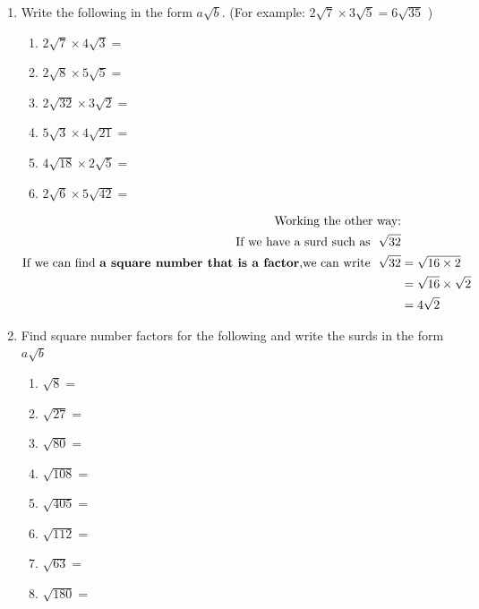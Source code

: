 \documentclass[a4paper,12pt]{article}
\begin{document}
\begin{enumerate}
	\item Write the following in the form $a\sqrt{b}$.
	(\footnotesize For example: $2\sqrt{7}\times 3\sqrt{5}=6\sqrt{35}$ \normalsize)
	\begin{multicols}{2}
		\begin{enumerate}
			\item $\displaystyle 2\sqrt{7}\times 4\sqrt{3}=$
			\item $\displaystyle 2\sqrt{8}\times 5\sqrt{5}=$
			\item $\displaystyle 2\sqrt{32}\times 3\sqrt{2}=$
			\item $\displaystyle 5\sqrt{3}\times 4\sqrt{21}=$
			\item $\displaystyle 4\sqrt{18}\times 2\sqrt{5}=$
			\item $\displaystyle 2\sqrt{6}\times 5\sqrt{42}=$
		\end{enumerate}
	\end{multicols}
	\begin{align*}
	\text{Working the other way:}&\\
	\text{If we have a surd such as~~} \sqrt{32}&\\
	\text{If we can find \textbf{a square number that is a factor},we can write~~} \sqrt{32}&=\sqrt{16\times 2}\\
	&=\sqrt{16}\times \sqrt{2}\\
	&=4\sqrt{2} 
	\end{align*}
	\item Find square number factors for the following and write the surds in the form $a\sqrt{b}$
	\begin{multicols}{2}
		\begin{enumerate}
			\item $\displaystyle \sqrt{8}=$
			\item $\displaystyle \sqrt{27}=$
			\item $\displaystyle \sqrt{80}=$
			\item $\displaystyle \sqrt{108}=$
			\item $\displaystyle \sqrt{405}=$
			\item $\displaystyle \sqrt{112}=$
			\item $\displaystyle \sqrt{63}=$
			\item $\displaystyle \sqrt{180}=$
		\end{enumerate}
	\end{multicols}
\end{enumerate}
\newpage
\end{document}
